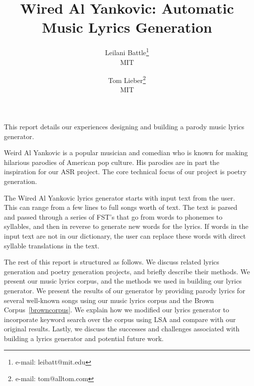 \documentclass{vgtc}                          %
\title{Wired Al Yankovic: Automatic Music Lyrics Generation}
\author{Leilani Battle\thanks{e-mail: leibatt@mit.edu}\\ %
        \scriptsize MIT %
\and Tom Lieber\thanks{e-mail: tom@alltom.com}\\ %
     \scriptsize MIT}
\begin{document}


\maketitle

\label{sec:intro}
This report details our experiences designing and building a parody music lyrics generator.

Weird Al Yankovic is a popular musician and comedian who is known for making
hilarious parodies of American pop culture. His parodies are in part the inspiration for our ASR
project. The core technical focus of our project is poetry generation.

The Wired Al Yankovic lyrics generator starts with input text from the user. This
can range from a few lines to full songs worth of text. The text is parsed and passed
through a series of FST's that go from words to phonemes to syllables, and then
in reverse to generate new words for the lyrics. If words in the input text
are not in our dictionary, the user can replace these words with direct
syllable translations in the text.

The rest of this report is structured as follows. We discuss related lyrics generation
and poetry generation projects, and briefly describe their methods. We present
our music lyrics corpus, and the methods we used in building our lyrics generator.
We present the results of our generator by providing parody lyrics for
several well-known songs using our music lyrics corpus
and the Brown Corpus~\ref{browncorpus}. We explain how we modified our lyrics generator
to incorporate keyword search over the corpus using LSA and compare with our original
results. Lastly, we discuss the successes
and challenges associated with building a lyrics generator and potential
future work.
\end{document}
